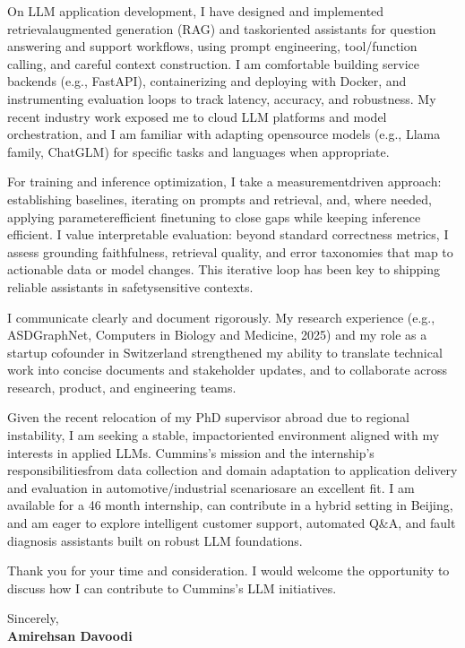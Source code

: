 \documentclass[11pt]{article}
\begin{document}
On LLM application development, I have designed and implemented retrieval\textendash{}augmented generation (RAG) and task\textendash{}oriented assistants for question answering and support workflows, using prompt engineering, tool/function calling, and careful context construction. I am comfortable building service backends (e.g., FastAPI), containerizing and deploying with Docker, and instrumenting evaluation loops to track latency, accuracy, and robustness. My recent industry work exposed me to cloud LLM platforms and model orchestration, and I am familiar with adapting open\textendash{}source models (e.g., Llama family, ChatGLM) for specific tasks and languages when appropriate.

For training and inference optimization, I take a measurement\textendash{}driven approach: establishing baselines, iterating on prompts and retrieval, and, where needed, applying parameter\textendash{}efficient fine\textendash{}tuning to close gaps while keeping inference efficient. I value interpretable evaluation: beyond standard correctness metrics, I assess grounding faithfulness, retrieval quality, and error taxonomies that map to actionable data or model changes. This iterative loop has been key to shipping reliable assistants in safety\textendash{}sensitive contexts.

I communicate clearly and document rigorously. My research experience (e.g., ASD\textendash{}GraphNet, Computers in Biology and Medicine, 2025) and my role as a startup co\textendash{}founder in Switzerland strengthened my ability to translate technical work into concise documents and stakeholder updates, and to collaborate across research, product, and engineering teams.

Given the recent relocation of my PhD supervisor abroad due to regional instability, I am seeking a stable, impact\textendash{}oriented environment aligned with my interests in applied LLMs. Cummins’s mission and the internship’s responsibilities\textemdash{}from data collection and domain adaptation to application delivery and evaluation in automotive/industrial scenarios\textemdash{}are an excellent fit. I am available for a 4\textendash{}6 month internship, can contribute in a hybrid setting in Beijing, and am eager to explore intelligent customer support, automated Q\&A, and fault diagnosis assistants built on robust LLM foundations.

Thank you for your time and consideration. I would welcome the opportunity to discuss how I can contribute to Cummins’s LLM initiatives.

Sincerely,\\[6pt]
\textbf{Amirehsan Davoodi}
\end{document}
